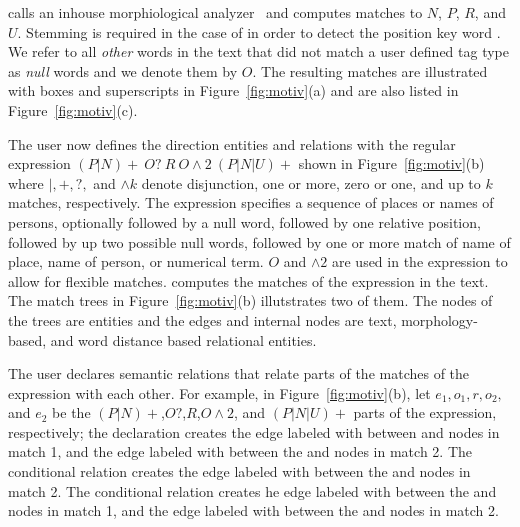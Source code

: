 \framework calls an inhouse morphiological analyzer~\cite{sarf} and computes matches to $N$, $P$, $R$, and $U$. 
Stemming is required in the case of  in order to detect the position key word . 
We refer to all {\em other} words in the text that did not match a user defined tag type as {\em null} words and we denote them
by $O$. 
The resulting matches are illustrated with boxes and superscripts in Figure~\ref{fig:motiv}(a) and are also listed 
in Figure~\ref{fig:motiv}(c).

The user now defines the direction entities and relations with the regular expression 
$(P|N)+~O?~R~O\wedge 2~(P|N|U)+$ shown in Figure~\ref{fig:motiv}(b) where 
$|,+,?,$ and $\wedge k$ denote disjunction, one or more, zero or one, and
up to $k$ matches, respectively.
The expression specifies a sequence of places or names of persons, 
optionally followed by a null word, 
followed by one relative position, followed by up two possible null words, 
followed by one or more match of name of place, name of person, or numerical term. 
$O$ and $\wedge 2$ are used in the expression to allow for flexible matches. 
\framework computes the matches of the expression in the text. 
The match trees in Figure~\ref{fig:motiv}(b) illutstrates two of them.
The nodes of the trees are entities and the edges and internal nodes are text, morphology-based, 
and word distance based relational entities. 

The user declares semantic relations that relate 
parts of the matches of the expression with each other. 
For example, in Figure~\ref{fig:motiv}(b), let $e_1,o_1,r,o_2,$ and $e_2$ be the 
$(P|N)+$,$O?$,$R$,$O\wedge 2$, and $(P|N|U)+$ parts of the expression, respectively;
the declaration  creates the 
edge labeled with  between  and  nodes in match 1, and the
edge labeled with  between the  and  nodes in match 2. 
The conditional relation  creates 
the edge labeled with  between the  and  nodes in match 2.
The conditional relation  creates 
he edge labeled with  between the  and  nodes in match 1, and the 
edge labeled with  between the  and  nodes in match 2. 

